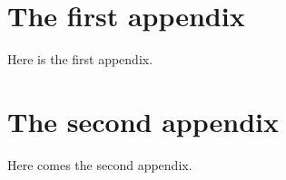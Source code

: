 \begin{appendix}

\chapter{The first appendix}
\thispagestyle{empty}

Here is the first appendix.


\chapter{The second appendix}
\thispagestyle{empty}

Here comes the second appendix.

\end{appendix}
